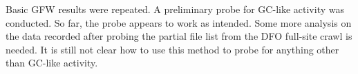 Basic GFW results were repeated.
A preliminary probe for GC-like activity was conducted.
So far, the probe appears to work as intended.
Some more analysis on the data recorded after probing the partial file list from the DFO full-site crawl is needed.
It is still not clear how to use this method to probe for anything other than GC-like activity.
